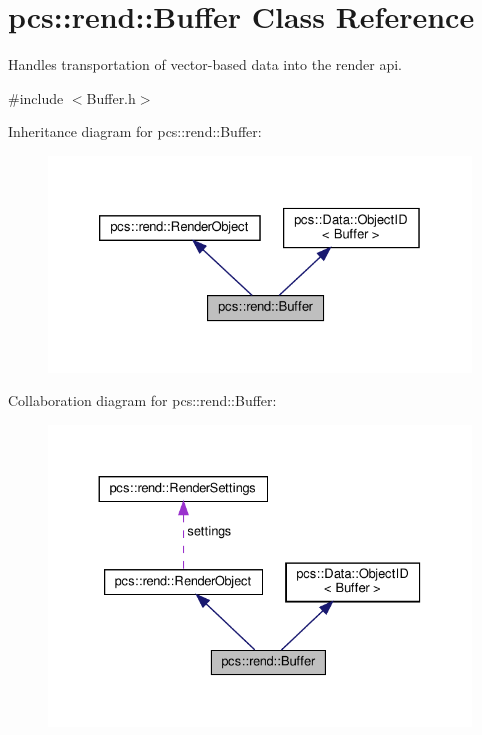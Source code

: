 \hypertarget{classpcs_1_1rend_1_1Buffer}{}\section{pcs\+:\+:rend\+:\+:Buffer Class Reference}
\label{classpcs_1_1rend_1_1Buffer}


Handles transportation of vector-\/based data into the render api.  




{\ttfamily \#include $<$Buffer.\+h$>$}



Inheritance diagram for pcs\+:\+:rend\+:\+:Buffer\+:\nopagebreak
\begin{figure}[H]
\begin{center}
\leavevmode
\includegraphics[width=326pt]{classpcs_1_1rend_1_1Buffer__inherit__graph}
\end{center}
\end{figure}


Collaboration diagram for pcs\+:\+:rend\+:\+:Buffer\+:\nopagebreak
\begin{figure}[H]
\begin{center}
\leavevmode
\includegraphics[width=330pt]{classpcs_1_1rend_1_1Buffer__coll__graph}
\end{center}
\end{figure}
